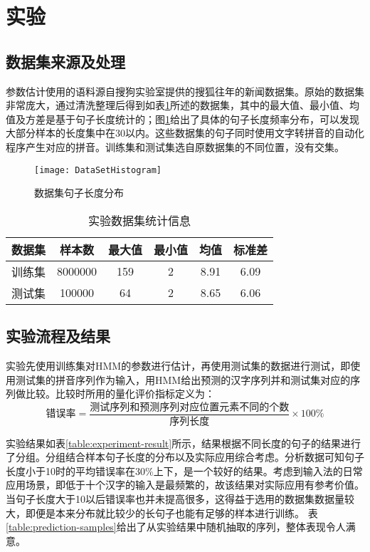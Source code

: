 \documentclass[12pt,a4paper]{ctexart}
\begin{document}
\section{实验}
\subsection{数据集来源及处理}
参数估计使用的语料源自搜狗实验室提供的搜狐往年的新闻数据集\cite{SogouCS}。原始的数据集非常庞大，通过清洗整理后得到如表\ref{table:dataset-stat}所述的数据集，其中的最大值、最小值、均值及方差是基于句子长度统计的；图\ref{fig:datasethistogram}给出了具体的句子长度频率分布，可以发现大部分样本的长度集中在30以内。这些数据集的句子同时使用文字转拼音的自动化程序\cite{python-pinyin}产生对应的拼音。训练集和测试集选自原数据集的不同位置，没有交集。
\bigskip
\begin{figure}[H]
	\centering
	\texttt{[image: DataSetHistogram]}
	\caption{数据集句子长度分布}
	\label{fig:datasethistogram}
\end{figure}
\bigskip
\begin{table}[H]
	\centering
\begin{tabular}{cccccc}
	\toprule  %
	数据集 & 样本数 & 最大值 & 最小值& 均值& 标准差\\
	\midrule  %
		训练集 & 8000000       & 159 & 2&8.91 & 6.09\\
测试集 & 100000 & 64 & 2 & 8.65 & 6.06\\
	\bottomrule %
\end{tabular}
\caption{实验数据集统计信息}
\label{table:dataset-stat}
\end{table}
\clearpage
\subsection{实验流程及结果}
实验先使用训练集对HMM的参数进行估计，再使用测试集的数据进行测试，即使用测试集的拼音序列作为输入，用HMM给出预测的汉字序列并和测试集对应的序列做比较。比较时所用的量化评价指标定义为：
\bigskip
\[ \mbox{错误率}=\frac{\mbox{测试序列和预测序列对应位置元素不同的个数}}{\mbox{序列长度}} \times 100\% \]

\bigskip

实验结果如表\ref{table:experiment-result}所示，结果根据不同长度的句子的结果进行了分组。分组结合样本句子长度的分布以及实际应用综合考虑。分析数据可知句子长度小于10时的平均错误率在30\%上下，是一个较好的结果。考虑到输入法的日常应用场景，即低于十个汉字的输入是最频繁的，故该结果对实际应用有参考价值。当句子长度大于10以后错误率也并未提高很多，这得益于选用的数据集数据量较大，即便是本来分布就比较少的长句子也能有足够的样本进行训练。
表\ref{table:prediction-samples}给出了从实验结果中随机抽取的序列，整体表现令人满意。
\bigskip
\bigskip
\end{document}
